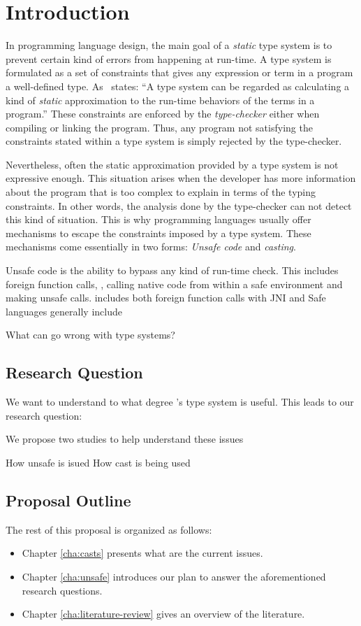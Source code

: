 
\chapter{Introduction}

In programming language design, the main goal of a \emph{static} type system is to prevent certain kind of errors from happening at run-time.
A type system is formulated as a set of constraints that gives any expression or term in a program a well-defined type.
As~\cite{pierceTypesProgrammingLanguages2002} states: ``A type system can be regarded as calculating a kind of \emph{static} approximation to the run-time behaviors of the terms in a program.''
These constraints are enforced by the \emph{type-checker} either when compiling or linking the program.
Thus, any program not satisfying the constraints stated within a type system is simply rejected by the type-checker.

Nevertheless, often the static approximation provided by a type system is not expressive enough.
This situation arises when the developer has more information about the program that is too complex to explain in terms of the typing constraints.
In other words, the analysis done by the type-checker can not detect this kind of situation.
This is why programming languages usually offer mechanisms to escape the constraints imposed by a type system.
These mechanisms come essentially in two forms: \emph{Unsafe code} and \emph{casting}.

Unsafe code is the ability to bypass any kind of run-time check.
This includes foreign function calls, \eg{}, calling native code from within a safe environment and making unsafe calls.
 includes both foreign function calls with JNI and Safe languages generally include 

What can go wrong with type systems?
\section{Research Question}

We want to understand to what degree \java{}'s type system is useful.
This leads to our research question:


We propose two studies to help understand these issues

How unsafe is isued
How cast is being used

\section{Proposal Outline}

The rest of this proposal is organized as follows:

\begin{itemize}
\item Chapter \ref{cha:casts} presents what are the current issues.
\item Chapter \ref{cha:unsafe} introduces our plan to answer the aforementioned research questions.
\item Chapter \ref{cha:literature-review} gives an overview of the literature.
\end{itemize}
